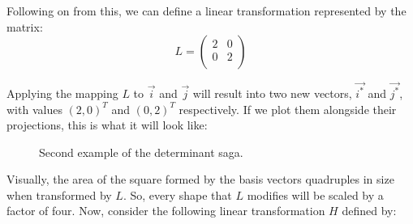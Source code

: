 \documentclass[a4,12pt,twosided,openany]{memoir}
\begin{document}
\indent
Following on from this, we can define a linear transformation represented by the matrix:
\[
L = \begin{pmatrix}
2 & 0   \\
0 & 2 \\
\end{pmatrix}
\]
\par 
\indent
Applying the mapping $L$ to $\overrightarrow{i}$ and $\overrightarrow{j}$ will result into two new vectors, $\overrightarrow{i^*}$ and $\overrightarrow{j^*}$, with values $(2,0)^T$ and $(0,2)^T$ respectively. If we plot them alongside their projections, this is what it will look like:
\begin{figure}[h!]
\begin{center}
\end{center}
\caption{Second example of the determinant saga.}
\end{figure}
\par 
\indent
Visually, the area of the square formed by the basis vectors quadruples in size when transformed by $L$. So, every shape that $L$ modifies will be scaled by a factor of four. Now, consider the following linear transformation $H$ defined by:
\end{document}
